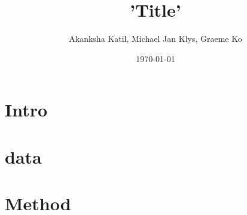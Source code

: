 \documentclass{article}
\title{'Title'}
\author{Akanksha Katil, Michael Jan Klys, Graeme Ko}
\date{\today}
\begin{document}
\maketitle

\section{Intro}



\section{data}


\section{Method}
\end{document}
